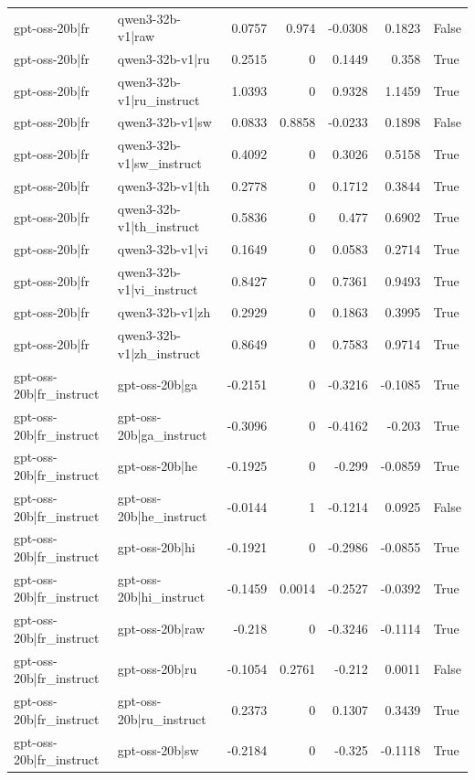 \begin{table}
\begin{tabular}{l l r r r r l}
gpt-oss-20b|fr & qwen3-32b-v1|raw & 0.0757 & 0.974 & -0.0308 & 0.1823 & False \\
gpt-oss-20b|fr & qwen3-32b-v1|ru & 0.2515 & 0 & 0.1449 & 0.358 & True \\
gpt-oss-20b|fr & qwen3-32b-v1|ru_instruct & 1.0393 & 0 & 0.9328 & 1.1459 & True \\
gpt-oss-20b|fr & qwen3-32b-v1|sw & 0.0833 & 0.8858 & -0.0233 & 0.1898 & False \\
gpt-oss-20b|fr & qwen3-32b-v1|sw_instruct & 0.4092 & 0 & 0.3026 & 0.5158 & True \\
gpt-oss-20b|fr & qwen3-32b-v1|th & 0.2778 & 0 & 0.1712 & 0.3844 & True \\
gpt-oss-20b|fr & qwen3-32b-v1|th_instruct & 0.5836 & 0 & 0.477 & 0.6902 & True \\
gpt-oss-20b|fr & qwen3-32b-v1|vi & 0.1649 & 0 & 0.0583 & 0.2714 & True \\
gpt-oss-20b|fr & qwen3-32b-v1|vi_instruct & 0.8427 & 0 & 0.7361 & 0.9493 & True \\
gpt-oss-20b|fr & qwen3-32b-v1|zh & 0.2929 & 0 & 0.1863 & 0.3995 & True \\
gpt-oss-20b|fr & qwen3-32b-v1|zh_instruct & 0.8649 & 0 & 0.7583 & 0.9714 & True \\
gpt-oss-20b|fr_instruct & gpt-oss-20b|ga & -0.2151 & 0 & -0.3216 & -0.1085 & True \\
gpt-oss-20b|fr_instruct & gpt-oss-20b|ga_instruct & -0.3096 & 0 & -0.4162 & -0.203 & True \\
gpt-oss-20b|fr_instruct & gpt-oss-20b|he & -0.1925 & 0 & -0.299 & -0.0859 & True \\
gpt-oss-20b|fr_instruct & gpt-oss-20b|he_instruct & -0.0144 & 1 & -0.1214 & 0.0925 & False \\
gpt-oss-20b|fr_instruct & gpt-oss-20b|hi & -0.1921 & 0 & -0.2986 & -0.0855 & True \\
gpt-oss-20b|fr_instruct & gpt-oss-20b|hi_instruct & -0.1459 & 0.0014 & -0.2527 & -0.0392 & True \\
gpt-oss-20b|fr_instruct & gpt-oss-20b|raw & -0.218 & 0 & -0.3246 & -0.1114 & True \\
gpt-oss-20b|fr_instruct & gpt-oss-20b|ru & -0.1054 & 0.2761 & -0.212 & 0.0011 & False \\
gpt-oss-20b|fr_instruct & gpt-oss-20b|ru_instruct & 0.2373 & 0 & 0.1307 & 0.3439 & True \\
gpt-oss-20b|fr_instruct & gpt-oss-20b|sw & -0.2184 & 0 & -0.325 & -0.1118 & True \\

\end{tabular}
\end{table}
